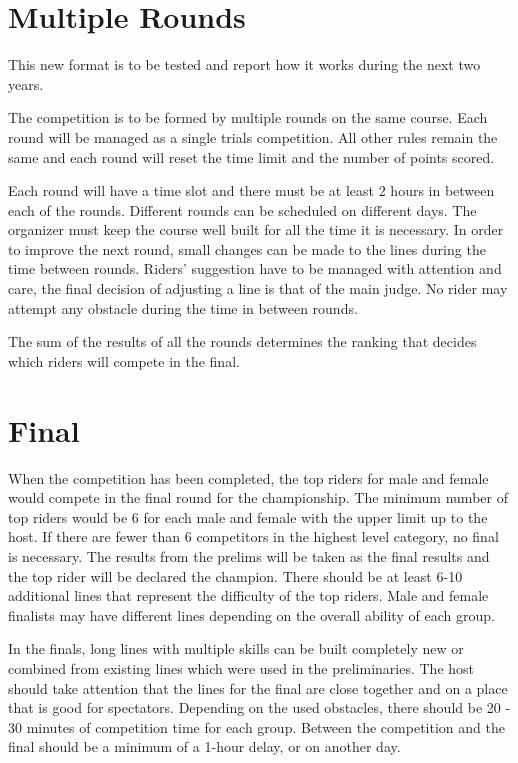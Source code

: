 \section{Multiple Rounds}
This new format is to be tested and report how it works during the next two years.

The competition is to be formed by multiple rounds on the same course.
Each round will be managed as a single trials competition.
All other rules remain the same and each round will reset the time limit and the number of points scored.

Each round will have a time slot and there must be at least 2 hours in between each of the rounds.
Different rounds can be scheduled on different days.
The organizer must keep the course well built for all the time it is necessary.
In order to improve the next round, small changes can be made to the lines during the time between rounds.
Riders' suggestion have to be managed with attention and care, the final decision of adjusting a line is that of the main judge.
No rider may attempt any obstacle during the time in between rounds.

The sum of the results of all the rounds determines the ranking that decides which riders will compete in the final.

\subsection{}

\section{Final}

When the competition has been completed, the top riders for male and female would compete in the final round for the championship.
The minimum number of top riders would be 6 for each male and female with the upper limit up to the host.
If there are fewer than 6 competitors in the highest level category, no final is necessary.
The results from the prelims will be taken as the final results and the top rider will be declared the champion. %
There should be at least 6-10 additional lines that represent the difficulty of the top riders.
Male and female finalists may have different lines depending on the overall ability of each group.

In the finals, long lines with multiple skills can be built completely new or combined from existing lines which were used in the preliminaries.
The host should take attention that the lines for the final are close together and on a place that is good for spectators.
Depending on the used obstacles, there should be 20 - 30 minutes of competition time for each group.
Between the competition and the final should be a minimum of a 1-hour delay, or on another day.

